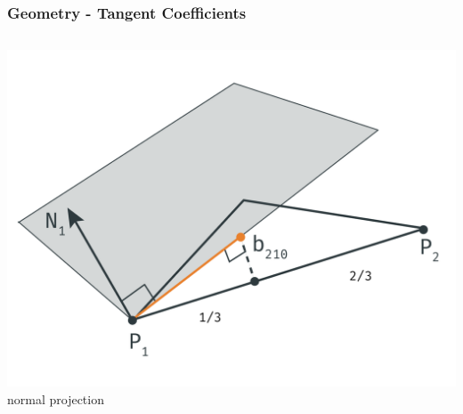 	\begin{frame}\frametitle{Geometry - Tangent Coefficients}
		\begin{columns}
			\begin{column}{0.6\textwidth}
				\begin{center}
				\includegraphics[width=\textwidth]{img/1_single/geometry_2.png}
				\small{normal projection}
				\end{center}
			\end{column}
		\end{columns}
	\end{frame}


